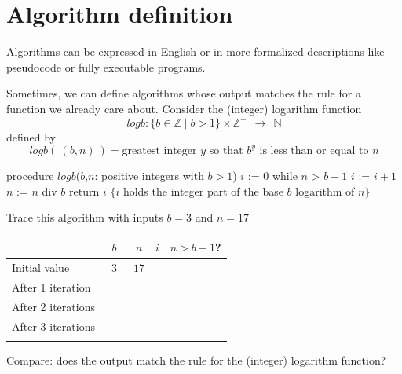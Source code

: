\documentclass[12pt, oneside]{article}
\begin{document}
\begin{flushright}
\end{flushright} \section*{Algorithm definition}



Algorithms can be expressed in English or in more formalized descriptions like pseudocode or fully executable programs.


Sometimes, we can define algorithms whose output matches the 
rule for a function we already care about. Consider the (integer) logarithm function
\[
logb  : \{b \in \mathbb{Z} \mid b >1 \}  \times \mathbb{Z}^+ ~~\to~~ \mathbb{N}
\]
defined by 
\[
logb (~ (b,n)~) =  \text{greatest integer } y \text{ so that } b^y  \text{ is less than or equal to } n 
\]



\begin{algorithm}[caption={Calculating integer part of base $b$ logarithm}]
   procedure $logb$($b$,$n$: positive integers with $b > 1$)
   $i$ := $0$
   while $n$ > $b-1$
     $i$ := $i + 1$
     $n$ := $n$ div $b$
   return $i$ $\{ i$ holds the integer part of the base $b$ logarithm of $n\}$
\end{algorithm} 
Trace this algorithm with inputs $b=3$ and $n=17$

\vfill
  \begin{tabular}{l|c|c|c|c}
  & $b$ & $n$ & $i$  & $n > b-1$?\\
  \hline 
  Initial value & ~$3$~ & $17$ & \phantom{$0$} & \phantom{~Yes~}\\
  After 1 iteration  & \phantom{$3$} & \phantom{$5$} & \phantom{$1$} & \phantom{T}\\
  After 2 iterations & \phantom{$3$} & \phantom{$1$} & \phantom{$2$} & \phantom{F}\\
  After 3 iterations &  &  & & \\
  &&&&\\
  \end{tabular}

\vfill

\vfill

Compare: does the output match the rule for the (integer) logarithm function?


\newpage \vfill
\end{document}
